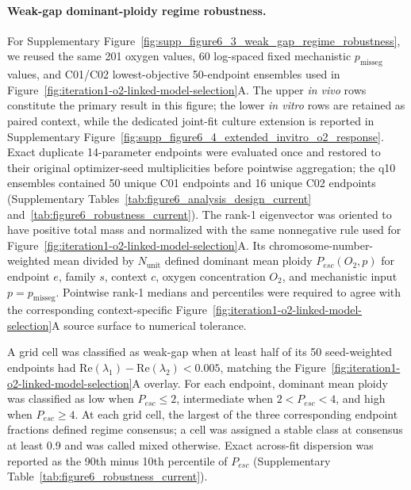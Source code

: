 \documentclass[11pt]{article}
\begin{document}
\paragraph{Weak-gap dominant-ploidy regime robustness.}
For Supplementary Figure~\ref{fig:supp_figure6_3_weak_gap_regime_robustness}, we reused the same 201 oxygen values, 60 log-spaced fixed mechanistic $p_{\mathrm{misseg}}$ values, and C01/C02 lowest-objective 50-endpoint ensembles used in Figure~\ref{fig:iteration1-o2-linked-model-selection}A. The upper \textit{in vivo} rows constitute the primary result in this figure; the lower \textit{in vitro} rows are retained as paired context, while the dedicated joint-fit culture extension is reported in Supplementary Figure~\ref{fig:supp_figure6_4_extended_invitro_o2_response}. Exact duplicate 14-parameter endpoints were evaluated once and restored to their original optimizer-seed multiplicities before pointwise aggregation; the q10 ensembles contained 50 unique C01 endpoints and 16 unique C02 endpoints (Supplementary Tables~\ref{tab:figure6_analysis_design_current} and~\ref{tab:figure6_robustness_current}). The rank-1 eigenvector was oriented to have positive total mass and normalized with the same nonnegative rule used for Figure~\ref{fig:iteration1-o2-linked-model-selection}A. Its chromosome-number-weighted mean divided by $N_{\mathrm{unit}}$ defined dominant mean ploidy $P_{esc}(O_2,p)$ for endpoint $e$, family $s$, context $c$, oxygen concentration $O_2$, and mechanistic input $p=p_{\mathrm{misseg}}$. Pointwise rank-1 medians and percentiles were required to agree with the corresponding context-specific Figure~\ref{fig:iteration1-o2-linked-model-selection}A source surface to numerical tolerance.

A grid cell was classified as weak-gap when at least half of its 50 seed-weighted endpoints had $\mathrm{Re}(\lambda_1)-\mathrm{Re}(\lambda_2)<0.005$, matching the Figure~\ref{fig:iteration1-o2-linked-model-selection}A overlay. For each endpoint, dominant mean ploidy was classified as low when $P_{esc}\leq2$, intermediate when $2<P_{esc}<4$, and high when $P_{esc}\geq4$. At each grid cell, the largest of the three corresponding endpoint fractions defined regime consensus; a cell was assigned a stable class at consensus at least 0.9 and was called mixed otherwise. Exact across-fit dispersion was reported as the 90th minus 10th percentile of $P_{esc}$ (Supplementary Table~\ref{tab:figure6_robustness_current}).
\end{document}
